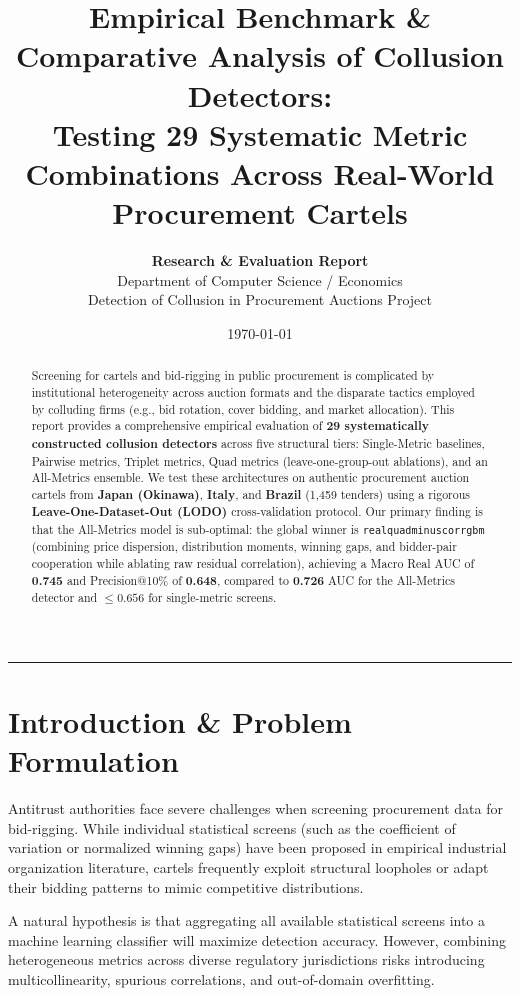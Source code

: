 \documentclass[11pt,a4paper]{article}
\title{\textbf{\Large Empirical Benchmark \& Comparative Analysis of Collusion Detectors:}\\
\large Testing 29 Systematic Metric Combinations Across Real-World Procurement Cartels}
\author{\textbf{Research \& Evaluation Report} \\ 
Department of Computer Science / Economics \\
Detection of Collusion in Procurement Auctions Project}
\date{\today}
\renewcommand{\_}{\textunderscore\allowbreak}
\begin{document}
\maketitle
\thispagestyle{empty}

\begin{abstract}
Screening for cartels and bid-rigging in public procurement is complicated by institutional heterogeneity across auction formats and the disparate tactics employed by colluding firms (e.g., bid rotation, cover bidding, and market allocation). This report provides a comprehensive empirical evaluation of \textbf{29 systematically constructed collusion detectors} across five structural tiers: Single-Metric baselines, Pairwise metrics, Triplet metrics, Quad metrics (leave-one-group-out ablations), and an All-Metrics ensemble. We test these architectures on authentic procurement auction cartels from \textbf{Japan (Okinawa)}, \textbf{Italy}, and \textbf{Brazil} (1,459 tenders) using a rigorous \textbf{Leave-One-Dataset-Out (LODO)} cross-validation protocol. Our primary finding is that the All-Metrics model is sub-optimal: the global winner is \texttt{real\_quad\_minus\_corr\_gbm} (combining price dispersion, distribution moments, winning gaps, and bidder-pair cooperation while ablating raw residual correlation), achieving a Macro Real AUC of \textbf{0.745} and Precision@10\% of \textbf{0.648}, compared to \textbf{0.726} AUC for the All-Metrics detector and $\le \mathbf{0.656}$ for single-metric screens.
\end{abstract}

\vspace{0.5em}
\hrule
\vspace{1.5em}

\section{Introduction \& Problem Formulation}

Antitrust authorities face severe challenges when screening procurement data for bid-rigging. While individual statistical screens (such as the coefficient of variation or normalized winning gaps) have been proposed in empirical industrial organization literature, cartels frequently exploit structural loopholes or adapt their bidding patterns to mimic competitive distributions. 

A natural hypothesis is that aggregating all available statistical screens into a machine learning classifier will maximize detection accuracy. However, combining heterogeneous metrics across diverse regulatory jurisdictions risks introducing multicollinearity, spurious correlations, and out-of-domain overfitting.
\end{document}

